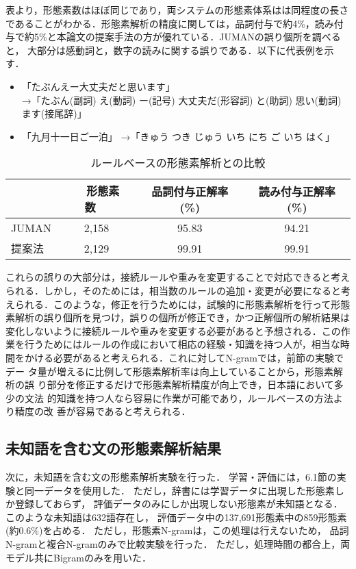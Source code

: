 表より，形態素数はほぼ同じであり，両システムの形態素体系はは同程度の長さ
であることがわかる．形態素解析の精度に関しては，品詞付与で約4\%，読み付
与で約5\%と本論文の提案手法の方が優れている．JUMANの誤り個所を調べると，
大部分は感動詞と，数字の読みに関する誤りである．以下に代表例を示す．
\begin{itemize}
\item 「たぶんえー大丈夫だと思います」 \\
 →「たぶん(副詞) え(動詞) ー(記号) 大丈夫だ(形容詞) と(助詞) 思い(動詞) ます(接尾辞)」
\item 「九月十一日ご一泊」
 →「きゅう つき じゅう いち にち ご いち はく」
\end{itemize}
\begin{table}[h]
\begin{center}
  \caption{ルールベースの形態素解析との比較}
  \label{tbl:RuleComparison}
  \begin{tabular}{|l||c|c|c|}
    \hline
      & ~~形態素数~~ & 品詞付与正解率(\%) & 読み付与正解率(\%) \\ \hline \hline
  JUMAN   &   2,158  &       95.83        &      94.21 \\ \hline
  提案法  &   2,129  &       99.91        &      99.91 \\ \hline
  \end{tabular}
\end{center}
\end{table}
\newpage
これらの誤りの大部分は，接続ルールや重みを変更することで対応できると考え
られる．しかし，そのためには，相当数のルールの追加・変更が必要になると考
えられる．このような，修正を行うためには，試験的に形態素解析を行って形態
素解析の誤り個所を見つけ，誤りの個所が修正でき，かつ正解個所の解析結果は
変化しないように接続ルールや重みを変更する必要があると予想される．この作
業を行うためにはルールの作成において相応の経験・知識を持つ人が，相当な時
間をかける必要があると考えられる．これに対してN-gramでは，前節の実験でデー
タ量が増えるに比例して形態素解析率は向上していることから，形態素解析の誤
り部分を修正するだけで形態素解析精度が向上でき，日本語において多少の文法
的知識を持つ人なら容易に作業が可能であり，ルールベースの方法より精度の改
善が容易であると考えられる．


\subsection{未知語を含む文の形態素解析結果}
次に，未知語を含む文の形態素解析実験を行った．
学習・評価には，6.1節の実験と同一データを使用した．
ただし，辞書には学習データに出現した形態素しか登録しておらず，
評価データのみにしか出現しない形態素が未知語となる．
このような未知語は632語存在し，
評価データ中の137,691形態素中の859形態素(約0.6\%)を占める．
ただし，形態素N-gramは，この処理は行えないため，
品詞N-gramと複合N-gramのみで比較実験を行った．
ただし，処理時間の都合上，両モデル共にBigramのみを用いた．


